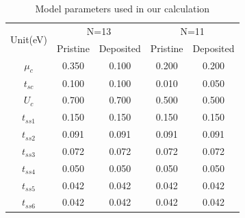 \documentclass[aps,prl,twocolumn,superscriptaddress]{revtex4}
\begin{document}
\begin{table}
    \caption{\label{tab:ModelParameters}
    Model parameters used in our calculation \cite{PhysRevX.7.041054}
    }
    \begin{ruledtabular}
        \begin{tabular}{ccccc}
            \multirow{2}{*}{Unit(eV)} & \multicolumn{2}{c}{N=13} &  \multicolumn{2}{c}{N=11} \\
            \cline{2-5}
            & Pristine & Deposited & Pristine & Deposited \\
            \cline{1-5}
            $\mu_c$ & 0.350 & 0.100 & 0.200 & 0.200 \\
            $t_{sc}$ & 0.100 & 0.100 & 0.010 & 0.050 \\
            $U_c$ & 0.700 & 0.700 & 0.500 & 0.500 \\
            $t_{ss1}$ & 0.150 & 0.150 & 0.150 & 0.150 \\
            $t_{ss2}$ & 0.091 & 0.091 & 0.091 & 0.091 \\
            $t_{ss3}$ & 0.072 & 0.072 & 0.072 & 0.072 \\
            $t_{ss4}$ & 0.050 & 0.050 & 0.050 & 0.050 \\
            $t_{ss5}$ & 0.042 & 0.042 & 0.042 & 0.042 \\
            $t_{ss6}$ & 0.042 & 0.042 & 0.042 & 0.042 \\
        \end{tabular}
    \end{ruledtabular}
\end{table}


\end{document}
